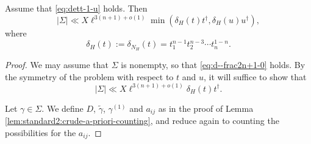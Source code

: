 \begin{lemma}\label{lem:standard2:we-have-begin}
  Assume that \eqref{eq:dett-1-u} holds.  Then
  \begin{equation}\label{eq:sigma_r-sx-ll-0}
    |\Sigma| \ll X \ell^{3 (n+1) + o(1)}
    \min(\delta_H(t) t^\dagger , \delta_H(u) u^\dagger),
  \end{equation}
  where
  \begin{equation*}
    \delta_H(t) := \delta_{N_H}(t) = t_1^{n-1} t_2^{n-3} \dotsb t_n^{1-n}.
  \end{equation*}
\end{lemma}
\begin{proof}
  We may assume that $\Sigma$ is nonempty, so that \eqref{eq:d--frac2n+1-0} holds.  By the symmetry of the problem with respect to $t$ and $u$, it will suffice to show that
  \begin{equation}\label{eq:sigma_r-sx-ll-0-b}
    |\Sigma| \ll X \ell^{3 (n+1) + o(1)}
    \delta_H(t) t^\dagger.
  \end{equation}

  Let $\gamma \in \Sigma$.  We define $D$, $\tilde{\gamma}$, $\gamma^{(1)}$ and $a_{i j}$ as in the proof of Lemma \ref{lem:standard2:crude-a-priori-counting}, and reduce again to counting the possibilities for the $a_{i j}$.


\end{proof}
